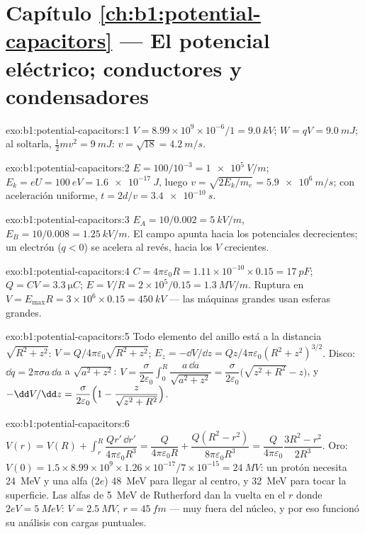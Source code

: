 \section*{Capítulo \ref{ch:b1:potential-capacitors} --- El potencial eléctrico; conductores y condensadores}

\begin{solution}{exo:b1:potential-capacitors:1}
$V = 8.99 \times 10^9 \times 10^{-6}/1 = \qty{9.0}{kV}$; $W = qV = \qty{9.0}{mJ}$;
al soltarla, $\tfrac12mv^2 = \qty{9}{mJ}$: $v = \sqrt{18} = \qty{4.2}{m/s}$.
\end{solution}

\begin{solution}{exo:b1:potential-capacitors:2}
$E = 100/10^{-3} = \qty{1e5}{V/m}$; $E_k = eU = \qty{100}{eV} = \qty{1.6e-17}{J}$,
luego $v = \sqrt{2E_k/m_e} = \qty{5.9e6}{m/s}$; con aceleración uniforme,
$t = 2d/v = \qty{3.4e-10}{s}$.
\end{solution}

\begin{solution}{exo:b1:potential-capacitors:3}
$E_A = 10/0.002 = \qty{5}{kV/m}$, $E_B = 10/0.008 = \qty{1.25}{kV/m}$. El
campo apunta hacia los potenciales decrecientes; un electrón ($q < 0$)
se acelera al revés, hacia los $V$ crecientes.
\end{solution}

\begin{solution}{exo:b1:potential-capacitors:4}
$C = 4\pi\varepsilon_0R = 1.11 \times 10^{-10} \times 0.15 = \qty{17}{pF}$; $Q = CV =
\qty{3.3}{\micro C}$; $E = V/R = 2 \times 10^5/0.15 = \qty{1.3}{MV/m}$. Ruptura
en $V = E_{\max}R = 3 \times 10^6 \times 0.15 = \qty{450}{kV}$ --- las máquinas
grandes usan esferas grandes.
\end{solution}

\begin{solution}{exo:b1:potential-capacitors:5}
Todo elemento del anillo está a la distancia $\sqrt{R^2 + z^2}$: $V =
Q/4\pi\varepsilon_0\sqrt{R^2 + z^2}$; $E_z = -\dd V/\dd z = Qz/4\pi\varepsilon_0(R^2 +
z^2)^{3/2}$. Disco: $\dd q = 2\pi\sigma a\,\dd a$ a $\sqrt{a^2 + z^2}$: $V =
\dfrac{\sigma}{2\varepsilon_0}\displaystyle\int_0^R\dfrac{a\,\dd a}{\sqrt{a^2 + z^2}} =
\dfrac{\sigma}{2\varepsilon_0}\bigl(\sqrt{z^2 + R^2} - z\bigr)$, y $-\dd V/\dd z =
\dfrac{\sigma}{2\varepsilon_0}\Bigl(1 - \dfrac{z}{\sqrt{z^2 + R^2}}\Bigr)$.
\end{solution}

\begin{solution}{exo:b1:potential-capacitors:6}
$V(r) = V(R) + \displaystyle\int_r^R\dfrac{Qr'\,\dd r'}{4\pi\varepsilon_0R^3} =
\dfrac{Q}{4\pi\varepsilon_0R} + \dfrac{Q(R^2 - r^2)}{8\pi\varepsilon_0R^3} = \dfrac{Q}{4\pi\varepsilon_0}
\dfrac{3R^2 - r^2}{2R^3}$. Oro: $V(0) = 1.5 \times 8.99 \times 10^9 \times 1.26 \times
10^{-17}/7 \times 10^{-15} = \qty{24}{MV}$: un protón necesita \qty{24}{MeV} y una alfa
($2e$) \qty{48}{MeV} para llegar al centro, y \qty{32}{MeV} para tocar la
superficie. Las alfas de \qty{5}{MeV} de Rutherford dan la vuelta en el $r$ donde $2eV =
\qty{5}{MeV}$: $V = \qty{2.5}{MV}$, $r = \qty{45}{fm}$ --- muy fuera del
núcleo, y por eso funcionó su análisis con cargas puntuales.
\end{solution}

